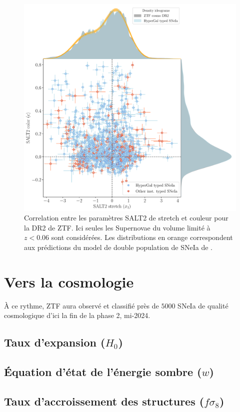 \documentclass[../main/main.tex]{subfiles}
\begin{document}
\begin{figure}[ht]
  \centering
  \includegraphics[width=1.1\textwidth]{../figures/09_dr2/stretch_color_driftmodel_dr2}
  \caption[Correlation entre les paramètres SALT2 de stretch et couleur
  (ZTF-DR2)]{ Correlation entre les paramètres SALT2 de stretch et
    couleur pour la DR2 de ZTF. Ici seules les Supernovae du
    volume limité à $z<0.06$ sont considérées. Les distributions en
    orange correspondent aux prédictions du model de double population
    de SNeIa de \citet{NoraNicolas21}.}
  \label{fig:ztfdr2saltcorr}
\end{figure}


\clearpage
\section{Vers la cosmologie}\label{sec:sniaztfcosmo}
À ce rythme, ZTF aura observé et classifié près de $5000$ SNeIa de
qualité cosmologique d'ici la
fin de la phase 2, mi-2024.
\subsection{Taux d'expansion ($H_{0}$)} 

\subsection{\'Equation d'état de l'énergie sombre ($w$)}

\subsection{Taux d'accroissement des structures ($f\sigma_{8}$)}




\end{document}
